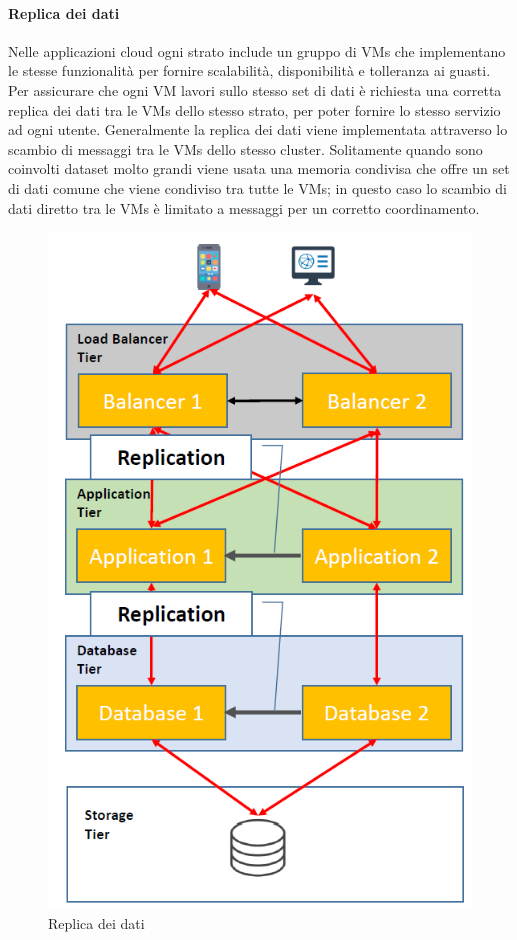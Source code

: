 \documentclass{article}
\begin{document}
\paragraph{Replica dei dati}
Nelle applicazioni cloud ogni strato include un gruppo di VMs che implementano le stesse funzionalità per fornire scalabilità, disponibilità e tolleranza ai guasti. Per assicurare che ogni VM lavori sullo stesso set di dati è richiesta una corretta replica dei dati tra le VMs dello stesso strato, per poter fornire lo stesso servizio ad ogni utente. Generalmente la replica dei dati viene implementata attraverso lo scambio di messaggi tra le VMs dello stesso cluster. Solitamente quando sono coinvolti dataset molto grandi viene usata una memoria condivisa che offre un set di dati comune che viene condiviso tra tutte le VMs; in questo caso lo scambio di dati diretto tra le VMs è limitato a messaggi per un corretto coordinamento.

\begin{figure}[H]
\centering
\includegraphics[scale=0.5]{img/Replica.PNG}
\caption{Replica dei dati}
\end{figure}
\end{document}
